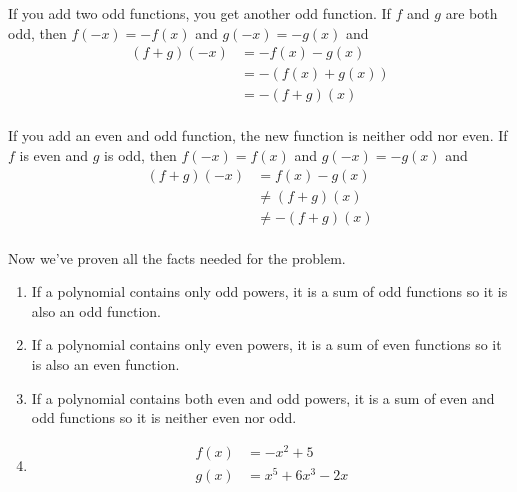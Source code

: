 \documentclass{exam}
\begin{document}
  If you add two odd functions, you get another odd function.  If $f$ and $g$ are both odd, then $f(-x) = -f(x)$ and
  $g(-x) = -g(x)$ and
  \begin{align*}
    (f + g)(-x) &= -f(x) - g(x) \\
                &= -(f(x) + g(x)) \\
                &= - (f + g)(x) \\
  \end{align*}

  If you add an even and odd function, the new function is neither odd nor even.  If $f$ is even and $g$ is odd, then
  $f(-x) = f(x)$ and $g(-x) = -g(x)$ and
  \begin{align*}
    (f + g)(-x) &= f(x) - g(x) \\
                &\neq (f + g)(x) \\
                &\neq -(f + g)(x) \\
  \end{align*}

  Now we've proven all the facts needed for the problem.

  \begin{enumerate}[a]
    \item If a polynomial contains only odd powers, it is a sum of odd functions so it is also an odd function.

    \item If a polynomial contains only even powers, it is a sum of even functions so it is also an even function.

    \item If a polynomial contains both even and odd powers, it is a sum of even and odd functions so it is neither even
      nor odd.

    \item
      \begin{align*}
        f(x) &= -x^2 + 5 \\
        g(x) &= x^5 + 6x^3 - 2x \\
      \end{align*}

  \end{enumerate}


  \ifprintanswers
    \pagebreak
  \fi
\end{document}
